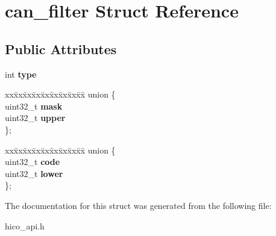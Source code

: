 \hypertarget{structcan__filter}{}\section{can\+\_\+filter Struct Reference}
\label{structcan__filter}
\subsection*{Public Attributes}
\begin{DoxyCompactItemize}
\item 
\mbox{\label{structcan__filter_a796cdd0845b3b22c44028a898938d3e0}} 
int {\bfseries type}
\item 
\mbox{\label{structcan__filter_a4831e5deb6d6475d8cad3ceae529c51f}} 
\begin{tabbing}
xx\=xx\=xx\=xx\=xx\=xx\=xx\=xx\=xx\=\kill
union \{\\
\>uint32\_t {\bfseries mask}\\
\>uint32\_t {\bfseries upper}\\
\}; \\

\end{tabbing}\item 
\mbox{\label{structcan__filter_afbb39bd7340f5fa3ce79d138919840d8}} 
\begin{tabbing}
xx\=xx\=xx\=xx\=xx\=xx\=xx\=xx\=xx\=\kill
union \{\\
\>uint32\_t {\bfseries code}\\
\>uint32\_t {\bfseries lower}\\
\}; \\

\end{tabbing}\end{DoxyCompactItemize}


The documentation for this struct was generated from the following file\+:\begin{DoxyCompactItemize}
\item 
hico\+\_\+api.\+h\end{DoxyCompactItemize}
